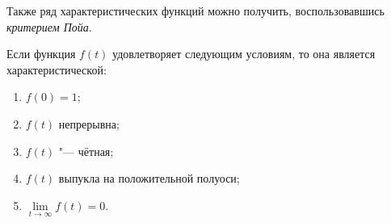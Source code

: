 Также ряд характеристических функций можно получить, воспользовавшись \emph{критерием Пойа}.
\begin{theorem}
    Если функция $ f(t) $ удовлетворяет следующим условиям, то она является характеристической:
    \begin{enumerate}
        \item $ f(0) = 1 $;
        \item $ f(t) $ непрерывна;
        \item $ f(t) $ "--- чётная;
        \item $ f(t) $ выпукла на положительной полуоси;
        \item $ \lim\limits_{t \to \infty} f(t) = 0 $.
    \end{enumerate}
\end{theorem}
